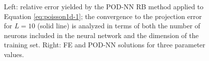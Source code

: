 \documentclass[12pt, a4paper, twoside, openright]{report}
\numberwithin{equation}{chapter}
\theoremstyle{theorem}
\theoremstyle{definition}
\theoremstyle{remark}
\theoremstyle{proposition}
\numberwithin{figure}{chapter}
\begin{document}
\begin{figure}[t!]
			
			\caption{Left: relative error yielded by the POD-NN RB method applied to Equation \eqref{eq:poisson1d-1}; the convergence to the projection error for $L = 10$ (solid line) is analyzed in terms of both the number of neurons included in the neural network and the dimension of the training set. Right: FE and POD-NN solutions for three parameter values.}
			\label{fig:poisson1d-1-fig3}
		\end{figure}
		
\end{document}

